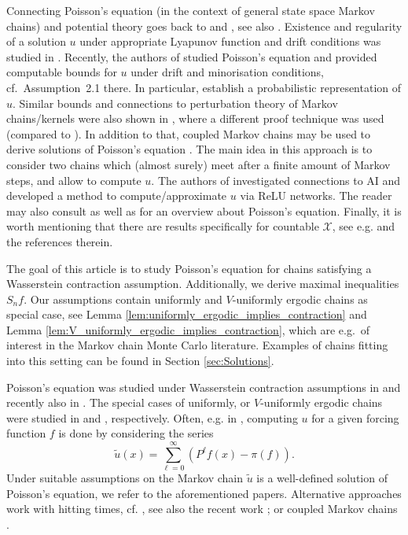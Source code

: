 \documentclass[12pt]{article}
\theoremstyle{plain}
\newcommand{\cX}{\mathcal{X}}
\begin{document}
Connecting Poisson's equation (in the context of general state space Markov chains) and potential theory goes back to \cite{neveu1972potentiel} and \cite{revuz1984markov}, see also \cite{nummelin1991poisson}.
Existence and regularity of a solution $u$ under appropriate Lyapunov function and drift conditions was studied in \cite{glynn1996liapounov}. 
Recently, the authors of \cite{glynn2025computableboundssolutionpoissons} studied Poisson's equation and provided computable bounds for $u$ under drift and minorisation conditions, cf.~Assumption~2.1 there.
In particular, \cite[Equation (2.10) and Theorem 2.1]{glynn2025computableboundssolutionpoissons} establish a probabilistic representation of $u$.
Similar bounds and connections to perturbation theory of Markov chains/kernels were also shown in \cite{herve2025computable}, where a different proof technique was used (compared to \cite{glynn2025computableboundssolutionpoissons}). 
In addition to that, coupled Markov chains may be used to derive solutions of Poisson's equation \cite{douc2025solvingpoissonequationusing}.
The main idea in this approach is to consider two chains which (almost surely) meet after a finite amount of Markov steps, and allow to compute $u$. 
The authors of \cite{qu2025deeplearningpoisson} investigated connections to AI and developed a method to compute/approximate $u$ via ReLU networks.
The reader may also consult \cite[Section 17.4.1]{meyn2009markov} as well as \cite[Section 21.2]{douc2018markov} for an overview about Poisson's equation. 
Finally, it is worth mentioning that there are results specifically for countable $\cX$, see e.g. \cite{glynn2024solution} and the references therein. 

The goal of this article is to study Poisson's equation for chains satisfying a Wasserstein contraction assumption. 
Additionally, we derive maximal inequalities $S_n f$. 
Our assumptions contain uniformly and $V$-uniformly ergodic chains as special case, see Lemma \ref{lem:uniformly_ergodic_implies_contraction} and Lemma \ref{lem:V_uniformly_ergodic_implies_contraction}, which are e.g.~of interest in the Markov chain Monte Carlo literature.
Examples of chains fitting into this setting can be found in Section \ref{sec:Solutions}. 

Poisson's equation was studied under Wasserstein contraction assumptions in \cite{bolt2012invariance} and recently also in \cite{hofstadler2024convergenceRates}. 
The special cases of uniformly, or $V$-uniformly ergodic chains were studied in \cite{GLYNN2002hoeffding} and \cite{glynn1996liapounov}, respectively. 
Often, e.g. in \cite{nummelin1991poisson,GLYNN2002hoeffding,meyn2009markov,bolt2012invariance,grama2018limit,herve2025computable, hofstadler2024convergenceRates}, computing $u$ for a given forcing function $f$ is done by considering the series
\[
\widetilde{u}(x) = 
\sum_{\ell=0}^\infty\left(  P^\ell f(x ) - \pi(f)\right). 
\]
Under suitable assumptions on the Markov chain $\widetilde{u}$ is a well-defined solution of Poisson's equation, we refer to the aforementioned papers. 
Alternative approaches work with hitting times, cf. \cite[Corollary 2.5]{nummelin1991poisson}, see also the recent work \cite{glynn2025computableboundssolutionpoissons}; or coupled Markov chains \cite{douc2025solvingpoissonequationusing}. 
\end{document}
